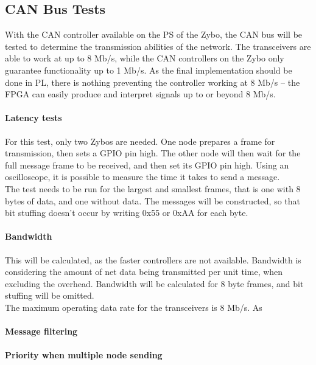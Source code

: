
\subsection{CAN Bus Tests}
With the CAN controller available on the PS of the Zybo, the CAN bus will be tested to determine the transmission abilities of the network.
The transceivers are able to work at up to 8 Mb/s, while the CAN controllers on the Zybo only guarantee functionality up to 1 Mb/s. 
As the final implementation should be done in PL, there is nothing preventing the controller working at 8 Mb/s -- the FPGA can easily produce and interpret signals up to or beyond 8 Mb/s.

\paragraph{Latency tests}
For this test, only two Zybos are needed.
One node prepares a frame for transmission, then sets a GPIO pin high.
The other node will then wait for the full message frame to be received, and then set its GPIO pin high.
Using an oscilloscope, it is possible to measure the time it takes to send a message.\\

The test needs to be run for the largest and smallest frames, that is one with 8 bytes of data, and one without data. 
The messages will be constructed, so that bit stuffing doesn't occur by writing 0x55 or 0xAA for each byte. 

\paragraph{Bandwidth}
This will be calculated, as the faster controllers are not available.
Bandwidth is considering the amount of net data being transmitted per unit time, when excluding the overhead.
Bandwidth will be calculated for 8 byte frames, and bit stuffing will be omitted.\\

The maximum operating data rate for the transceivers is 8 Mb/s.
As 

\paragraph{Message filtering}

\paragraph{Priority when multiple node sending}